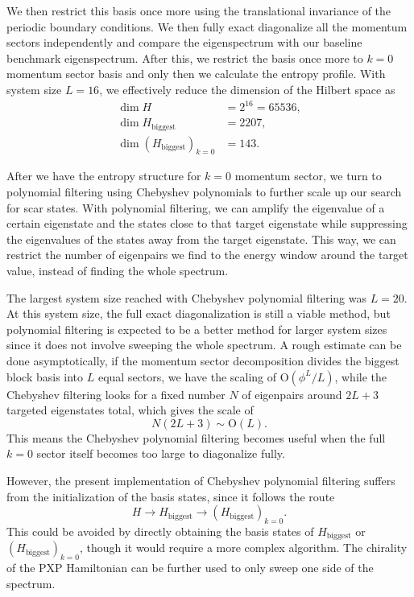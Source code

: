 \documentclass[%
 reprint,
 amsmath,amssymb,
 aps,
]{revtex4-2}
\begin{document}
We then restrict this basis once more using the translational invariance of the periodic boundary conditions. We then fully exact diagonalize all the momentum sectors independently and compare the eigenspectrum with our baseline benchmark eigenspectrum. After this, we restrict the basis once more to $k = 0$ momentum sector basis and only then we calculate the entropy profile. With system size $L = 16$, we effectively reduce the dimension of the Hilbert space as
\begin{equation}
\begin{aligned}
\dim H &= 2^{16} = 65536,\\
\dim H_{\mathrm{biggest}} &= 2207,\\
\dim \left(H_{\mathrm{biggest}}\right)_{k=0} &= 143.
\end{aligned}
\end{equation}

After we have the entropy structure for $k = 0$ momentum sector, we turn to polynomial filtering using Chebyshev polynomials to further scale up our search for scar states. With polynomial filtering, we can amplify the eigenvalue of a certain eigenstate and the states close to that target eigenstate while suppressing the eigenvalues of the states away from the target eigenstate. This way, we can restrict the number of eigenpairs we find to the energy window around the target value, instead of finding the whole spectrum.

The largest system size reached with Chebyshev polynomial filtering was $L = 20$. At this system size, the full exact diagonalization is still a viable method, but polynomial filtering is expected to be a better method for larger system sizes since it does not involve sweeping the whole spectrum. A rough estimate can be done asymptotically, if the momentum sector decomposition divides the biggest block basis into $L$ equal sectors, we have the scaling of $\mathrm{O}(\phi^L/L)$, while the Chebyshev filtering looks for a fixed number $N$ of eigenpairs around $2L + 3$ targeted eigenstates total, which gives the scale of
\begin{equation}
    N(2L+3) \sim \mathrm{O}(L).
\end{equation}
This means the Chebyshev polynomial filtering becomes useful when the full $k=0$ sector itself becomes too large to diagonalize fully.

However, the present implementation of Chebyshev polynomial filtering suffers from the initialization of the basis states, since it follows the route
\begin{equation}
    H \rightarrow H_{\mathrm{biggest}} \rightarrow (H_{\mathrm{biggest}})_{k=0}.
\end{equation}
This could be avoided by directly obtaining the basis states of $H_{\mathrm{biggest}}$ or $(H_{\mathrm{biggest}})_{k=0}$, though it would require a more complex algorithm. The chirality of the PXP Hamiltonian can be further used to only sweep one side of the spectrum.
\end{document}
